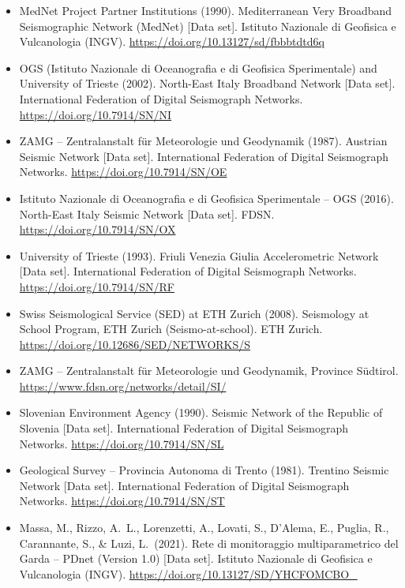 \begin{itemize}[leftmargin=*]
  \item[\textbf{[MN]}] MedNet Project Partner Institutions (1990).
    Mediterranean Very Broadband Seismographic Network (MedNet) [Data set].
    Istituto Nazionale di Geofisica e Vulcanologia (INGV).
    \url{https://doi.org/10.13127/sd/fbbbtdtd6q}

  \item[\textbf{[NI]}] OGS (Istituto Nazionale di Oceanografia e di
    Geofisica Sperimentale) and University of Trieste (2002). North-East
    Italy Broadband Network [Data set]. International Federation of Digital
    Seismograph Networks.
    \url{https://doi.org/10.7914/SN/NI}

  \item[\textbf{[OE]}] ZAMG -- Zentralanstalt f\"ur Meteorologie und
    Geodynamik (1987). Austrian Seismic Network [Data set]. International
    Federation of Digital Seismograph Networks.
    \url{https://doi.org/10.7914/SN/OE}

  \item[\textbf{[OX]}] Istituto Nazionale di Oceanografia e di Geofisica
    Sperimentale -- OGS (2016). North-East Italy Seismic Network [Data
    set]. FDSN.
    \url{https://doi.org/10.7914/SN/OX}

  \item[\textbf{[RF]}] University of Trieste (1993). Friuli Venezia
    Giulia Accelerometric Network [Data set]. International Federation of
    Digital Seismograph Networks.
    \url{https://doi.org/10.7914/SN/RF}

  \item[\textbf{[S]}] Swiss Seismological Service (SED) at ETH Zurich
    (2008). Seismology at School Program, ETH Zurich (Seismo-at-school).
    ETH Zurich.
    \url{https://doi.org/10.12686/SED/NETWORKS/S}

  \item[\textbf{[SI]}] ZAMG -- Zentralanstalt f\"ur Meteorologie und
    Geodynamik, Province S\"udtirol.
    \url{https://www.fdsn.org/networks/detail/SI/}

  \item[\textbf{[SL]}] Slovenian Environment Agency (1990). Seismic
    Network of the Republic of Slovenia [Data set]. International
    Federation of Digital Seismograph Networks.
    \url{https://doi.org/10.7914/SN/SL}

  \item[\textbf{[ST]}] Geological Survey -- Provincia Autonoma di Trento
    (1981). Trentino Seismic Network [Data set]. International Federation
    of Digital Seismograph Networks.
    \url{https://doi.org/10.7914/SN/ST}

  \item[\textbf{[ZO]}] Massa, M., Rizzo, A.\ L., Lorenzetti, A.,
    Lovati, S., D'Alema, E., Puglia, R., Carannante, S., \& Luzi, L.\
    (2021). Rete di monitoraggio multiparametrico del Garda -- PDnet
    (Version 1.0) [Data set]. Istituto Nazionale di Geofisica e
    Vulcanologia (INGV).
    \url{https://doi.org/10.13127/SD/YHCFOMCBO_}

\end{itemize}
